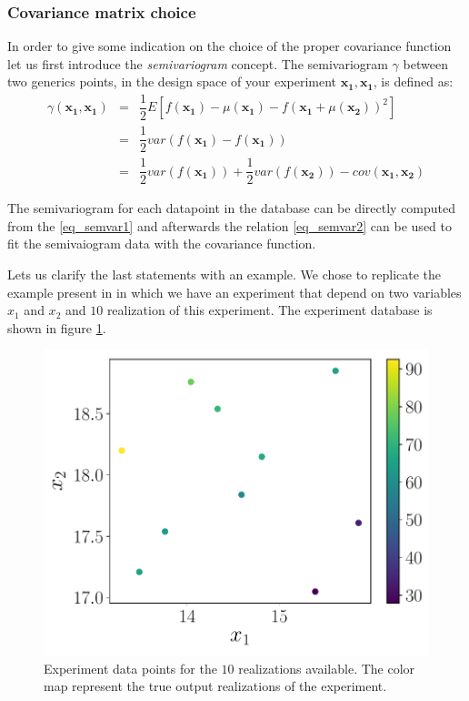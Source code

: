 \subsubsection{Covariance matrix choice}
\label{sec:cov}

In order to give some indication on the choice of the proper covariance function let us first introduce the \textit{semivariogram} concept.
The semivariogram $\gamma$ between two generics points, in the design space of your experiment $\mathbf{x_1}, \mathbf{x_1}$, is defined as:
\begin{eqnarray}
\gamma(\mathbf{x_1}, \mathbf{x_1}) &=& \dfrac{1}{2} E \left[  f(\mathbf{x_1}) -\mu(\mathbf{x_1}) -f(\mathbf{x_1} +\mu(\mathbf{x_2}))^2 \right] \label{eq_semvar1}\\
&=& \dfrac{1}{2} var(f(\mathbf{x_1}) -f(\mathbf{x_1}) ) \nonumber \\
&=& \dfrac{1}{2} var(f(\mathbf{x_1}))  +\dfrac{1}{2} var(f(\mathbf{x_2})) -cov(\mathbf{x_1}, \mathbf{x_2}) \label{eq_semvar2}
\end{eqnarray}

The semivariogram for each datapoint in the database can be directly computed from the \eqref{eq_semvar1} and afterwards the relation \eqref{eq_semvar2} can be used to fit the semivaiogram data with the covariance function.

Lets us clarify the last statements with an example. We chose to replicate the example present in \citet{cavazzuti2012optimization} in which we have an experiment that depend on two variables $x_1$ and $x_2$ and $10$ realization of this experiment. The experiment database is shown in figure \ref{fig:doedata}.

\begin{figure}[t]
	\centering
	\includegraphics[width=0.5\linewidth]{appendix_a/DOE_data}
	\caption{Experiment data points for the $10$ realizations available. The color map represent the true output realizations of the experiment.}
	\label{fig:doedata}
\end{figure}

